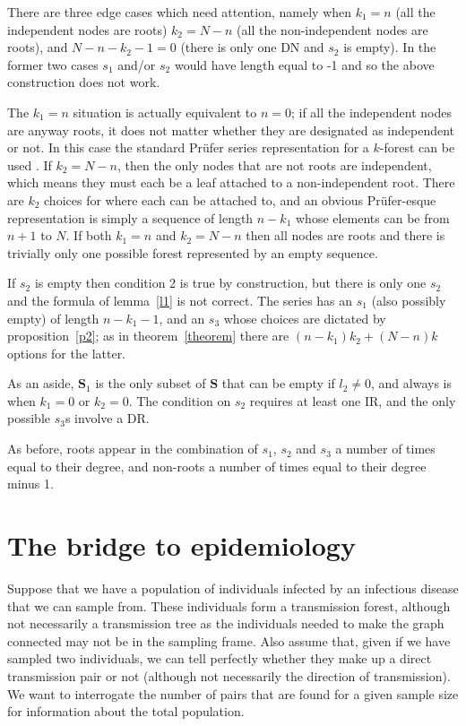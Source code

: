 \documentclass{article}
\newcommand{\prufer}{Pr{\"u}fer }
\begin{document}
There are three edge cases which need attention, namely when $k_1=n$ (all the independent nodes are roots) $k_2=N-n$ (all the non-independent nodes are roots), and $N-n-k_2-1=0$ (there is only one DN and $s_2$ is empty). In the former two cases $s_1$ and/or $s_2$ would have length equal to -1 and so the above construction does not work. 

The $k_1=n$ situation is actually equivalent to $n=0$; if all the independent nodes are anyway roots, it does not matter whether they are designated as independent or not. In this case the standard \prufer series representation for a $k$-forest can be used \cite{Lavault2011-ta}. If $k_2=N-n$, then the only nodes that are not roots are independent, which means they must each be a leaf attached to a non-independent root. There are $k_2$ choices for where each can be attached to, and an obvious Pr{\"u}fer-esque representation is simply a sequence of length $n-k_1$ whose elements can be from $n+1$ to $N$. If both $k_1=n$ and $k_2=N-n$ then all nodes are roots and there is trivially only one possible forest represented by an empty sequence.

If $s_2$ is empty then condition 2 is true by construction, but there is only one $s_2$ and the formula of lemma~\ref{l1} is not correct. The series has an $s_1$ (also possibly empty) of length $n-k_1-1$, and an $s_3$ whose choices are dictated by proposition~\ref{p2}; as in theorem~\ref{theorem} there are $(n-k_1)k_2 + (N-n)k$ options for the latter.

As an aside, $\mathbf{S}_1$ is the only subset of $\mathbf{S}$ that can be empty if $l_2\neq0$, and always is when $k_1=0$ or $k_2=0$. The condition on $s_2$ requires at least one $\mathrm{IR}$, and the only possible $s_3$s involve a $\mathrm{DR}$.

As before, roots appear in the combination of $s_1$, $s_2$ and $s_3$ a number of times equal to their degree, and non-roots a number of times equal to their degree minus 1.

\section{The bridge to epidemiology}

Suppose that we have a population of individuals infected by an infectious disease that we can sample from. These individuals form a transmission forest, although not necessarily a transmission tree as the individuals needed to make the graph connected may not be in the sampling frame. Also assume that, given if we have sampled two individuals, we can tell perfectly whether they make up a direct transmission pair or not (although not necessarily the direction of transmission). We want to interrogate the number of pairs that are found for a given sample size for information about the total population.
\end{document}
